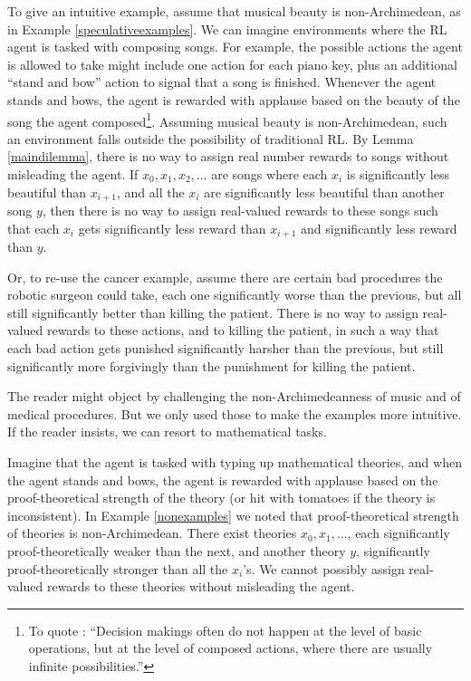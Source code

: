 \documentclass[twoside,11pt]{article}
\begin{document}
\begin{example}
\label{musicalexample}
To give an intuitive example, assume that musical beauty is non-Archimedean,
as in Example \ref{speculativeexamples}. We can imagine environments where the
RL agent is tasked with composing songs. For example, the possible actions the
agent is allowed to take might include one action for each piano key, plus
an additional ``stand and bow'' action to signal that a song is
finished.
Whenever the agent stands and bows, the agent is rewarded with applause based on
the beauty of the song the agent
composed\footnote{To quote \cite{wang2015assumptions}: ``Decision makings often do not happen
at the level of basic operations, but at the level of composed actions, where
there are usually infinite possibilities.''}. Assuming
musical beauty is
non-Archimedean, such an environment falls outside the possibility of traditional
RL. By Lemma \ref{maindilemma}, there is no way to assign real number
rewards to songs without misleading the agent. If $x_0,x_1,x_2,\ldots$ are songs
where each $x_{i}$ is significantly less beautiful than $x_{i+1}$, and
all the $x_i$ are significantly less beautiful than another song $y$,
then there is no way to
assign real-valued rewards to these songs such that each $x_{i}$ gets
significantly less reward than $x_{i+1}$ and significantly less reward
than $y$.
\end{example}

Or, to re-use the cancer example, assume there are certain bad procedures the
robotic surgeon could take, each one significantly worse than the previous,
but all still significantly better than killing the patient. There is no way
to assign real-valued rewards to these actions, and to killing the patient,
in such a way that each bad action gets punished significantly harsher than
the previous, but still significantly more forgivingly than the punishment for
killing the patient.

The reader might object by challenging the non-Archimedeanness
of music and of medical procedures. But we only used those to make the examples
more intuitive. If the reader insists, we can resort to mathematical tasks.

\begin{example}
\label{theoryexample}
Imagine that the agent is tasked with
typing up mathematical theories, and when the agent stands and bows, the agent
is rewarded with applause based on the proof-theoretical strength of the theory
(or hit with tomatoes if the theory is inconsistent).
In Example \ref{nonexamples} we noted that proof-theoretical strength of theories
is non-Archimedean. There exist theories $x_0,x_1,\ldots$, each significantly
proof-theoretically weaker than the next, and another theory $y$,
significantly proof-theoretically stronger than all the $x_i$'s. We cannot
possibly assign real-valued rewards to these theories without misleading the
agent.
\end{example}
\end{document}
